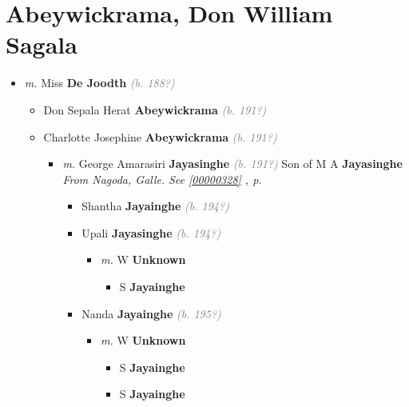 \documentclass[10pt, openany]{book}
\begin{document}
\chapter{Abeywickrama, Don William Sagala}
\label{00000030}
\textcolor{slmaroon}{\textit{}}
\begin{itemize}
\item{\textit{m.} Miss \textbf{De Joodth} \textcolor{gray}{\textit{(b. 188?)}}   \label{couple:00000030:00000137} \begin{itemize}
\item{Don Sepala Herat \textbf{Abeywickrama} \textcolor{gray}{\textit{(b. 191?)}}
   }
\item{Charlotte Josephine \textbf{Abeywickrama} \textcolor{gray}{\textit{(b. 191?)}}
\begin{itemize}
\item{\textit{m.} George Amarasiri \textbf{Jayasinghe} \textcolor{gray}{\textit{(b. 191?)}} Son of  M A \textbf{Jayasinghe} \textcolor{slorange}{\textit{}} \textcolor{slmaroon}{\textit{From Nagoda, Galle.}} \textcolor{slteal}{\textit{See  \autoref{00000328} \textit{, p. \pageref{00000328} }}}   \label{couple:00000020:00000329} \begin{itemize}
\item{Shantha \textbf{Jayainghe} \textcolor{gray}{\textit{(b. 194?)}}
 }
\item{Upali \textbf{Jayasinghe} \textcolor{gray}{\textit{(b. 194?)}}
\begin{itemize}
\item{\textit{m.} W \textbf{Unknown} \textcolor{slorange}{\textit{}}   \label{couple:00000261:00000915} \begin{itemize}
\item{S \textbf{Jayainghe} \textcolor{slorange}{\textit{}}
 }
\end{itemize}}
\end{itemize}
 }
\item{Nanda \textbf{Jayainghe} \textcolor{gray}{\textit{(b. 195?)}}
\begin{itemize}
\item{\textit{m.} W \textbf{Unknown} \textcolor{slorange}{\textit{}}   \label{couple:00000256:00000914} \begin{itemize}
\item{S \textbf{Jayainghe} \textcolor{slorange}{\textit{}}
 }
\item{S \textbf{Jayainghe} \textcolor{slorange}{\textit{}}
}
\end{itemize}}
\end{itemize}}
\end{itemize}}
\end{itemize}}
\end{itemize}}
\end{itemize}
\end{document}
